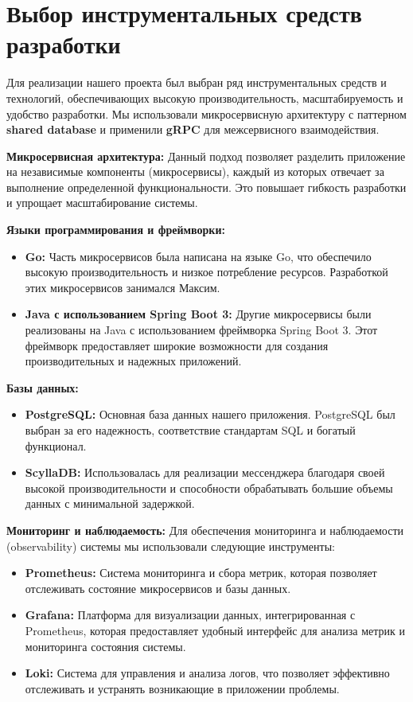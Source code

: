 \section{Выбор инструментальных средств разработки}

Для реализации нашего проекта был выбран ряд инструментальных средств и технологий, обеспечивающих высокую производительность, масштабируемость и удобство разработки. Мы использовали микросервисную архитектуру с паттерном \textbf{shared database} и применили \textbf{gRPC} для межсервисного взаимодействия.

\textbf{Микросервисная архитектура:}
Данный подход позволяет разделить приложение на независимые компоненты (микросервисы), каждый из которых отвечает за выполнение определенной функциональности. Это повышает гибкость разработки и упрощает масштабирование системы.

\textbf{Языки программирования и фреймворки:}
\begin{itemize}
    \item \textbf{Go:} Часть микросервисов была написана на языке Go, что обеспечило высокую производительность и низкое потребление ресурсов. Разработкой этих микросервисов занимался Максим.
    \item \textbf{Java с использованием Spring Boot 3:} Другие микросервисы были реализованы на Java с использованием фреймворка Spring Boot 3. Этот фреймворк предоставляет широкие возможности для создания производительных и надежных приложений.
\end{itemize}

\textbf{Базы данных:}
\begin{itemize}
    \item \textbf{PostgreSQL:} Основная база данных нашего приложения. PostgreSQL был выбран за его надежность, соответствие стандартам SQL и богатый функционал.
    \item \textbf{ScyllaDB:} Использовалась для реализации мессенджера благодаря своей высокой производительности и способности обрабатывать большие объемы данных с минимальной задержкой.
\end{itemize}

\textbf{Мониторинг и наблюдаемость:}
Для обеспечения мониторинга и наблюдаемости (observability) системы мы использовали следующие инструменты:
\begin{itemize}
    \item \textbf{Prometheus:} Система мониторинга и сбора метрик, которая позволяет отслеживать состояние микросервисов и базы данных.
    \item \textbf{Grafana:} Платформа для визуализации данных, интегрированная с Prometheus, которая предоставляет удобный интерфейс для анализа метрик и мониторинга состояния системы.
    \item \textbf{Loki:} Система для управления и анализа логов, что позволяет эффективно отслеживать и устранять возникающие в приложении проблемы.
\end{itemize}

